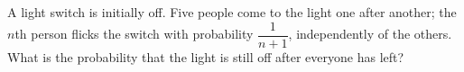 A light switch is initially off. Five people come to the light one after another; the $n$th person flicks the switch with probability $\dfrac{1}{n+1}$, independently of the others. What is the probability that the light is still off after everyone has left?
